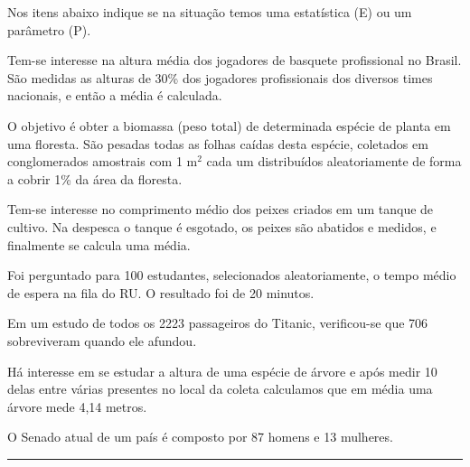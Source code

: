 \documentclass[a4paper,11pt,fleqn]{article}\usepackage[]{graphicx}\usepackage[]{color}
\theoremstyle{definition}
\begin{document}
\begin{compactenum}[2.]
\item Nos itens abaixo indique se na situação temos
  uma estatística (E) ou um parâmetro (P).
  \begin{compactenum}
\item Tem-se interesse na altura média dos jogadores de basquete
  profissional no Brasil. São medidas as alturas de 30\% dos jogadores
  profissionais dos diversos times nacionais, e então a média é
  calculada.
\item O objetivo é obter a biomassa (peso total) de determinada espécie
  de planta em uma floresta. São pesadas todas as folhas caídas desta
  espécie, coletados em conglomerados amostrais com 1 m$^2$ cada um
  distribuídos aleatoriamente de forma a cobrir 1\% da área da
  floresta.
\item Tem-se interesse no comprimento médio dos peixes criados em
  um tanque de cultivo. Na despesca o tanque é esgotado, os
  peixes são abatidos e medidos, e finalmente se calcula uma média.
\item Foi perguntado para 100 estudantes, selecionados aleatoriamente, o
  tempo médio de espera na fila do RU. O resultado foi de 20 minutos.
\item Em um estudo de todos os 2223 passageiros do Titanic, verificou-se
  que 706 sobreviveram quando ele afundou.
\item Há interesse em se estudar a altura de uma espécie de árvore
  e após medir 10 delas entre várias presentes no local da
  coleta calculamos que em média uma árvore mede 4,14 metros.
\item O Senado atual de um país é composto por 87 homens e 13 mulheres.
  \end{compactenum}
\end{compactenum}

\vspace{0.3cm}
\hrule
\vspace{0.3cm}
\end{document}
